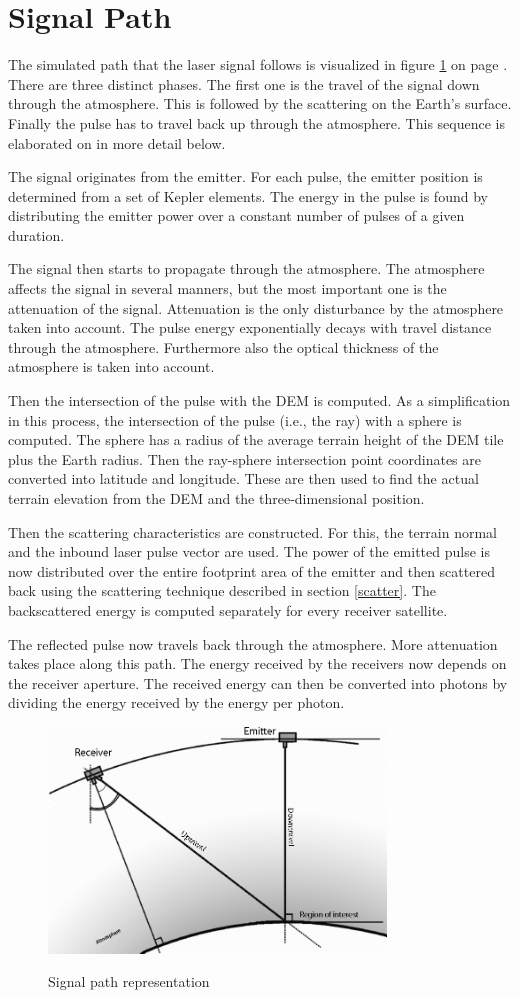 \section{Signal Path}
\label{signPath}

The simulated path that the \ac{laser} signal follows is visualized in figure \ref{signPath} on 
page \pageref{signPath}. There are three distinct phases. The first one is the travel of the
signal down through the atmosphere. This is followed by the scattering on the Earth's surface. Finally the
pulse has to travel back up through the atmosphere. This sequence is elaborated on in more
detail below.

The signal originates from the emitter. For each pulse, the emitter position is determined from
a set of Kepler elements. The energy in the pulse is found by distributing the emitter power over a
constant number of pulses of a given duration.

The signal then starts to propagate through the atmosphere. The atmosphere affects the signal in
several manners, but the most important one is the attenuation of the signal. Attenuation is the
only disturbance by the atmosphere taken into account. The pulse energy exponentially decays with
travel distance through the atmosphere. Furthermore also the optical thickness of the atmosphere is taken into account.

Then the intersection of the pulse with the \ac{DEM} is computed. As a simplification in this
process, the intersection of the pulse (i.e., the ray) with a sphere is computed. The sphere has a radius of
the average terrain height of the \ac{DEM} tile plus the Earth radius. Then the ray-sphere
intersection point coordinates are converted into latitude and longitude. These are then used to 
find the actual terrain elevation from the \ac{DEM} and the three-dimensional position.

Then the scattering characteristics are constructed. For this, the terrain normal and the inbound
laser pulse vector are used. The power of the emitted pulse is now distributed over the entire
footprint area of the emitter and then scattered back using the scattering technique described in
section \ref{scatter}. The backscattered energy is computed separately for every receiver satellite.

The reflected pulse now travels back through the atmosphere. More attenuation takes
place along this path. The energy received by the receivers now depends on the receiver aperture. The received
energy can then be converted into photons by dividing the energy received by the energy per photon.

\begin{figure}[ht!]
	\centering
		\includegraphics[width=0.8\textwidth]{chapters/img/signalPath.png}
		\label{fig:signalPath}
	\caption{Signal path representation}
\end{figure}